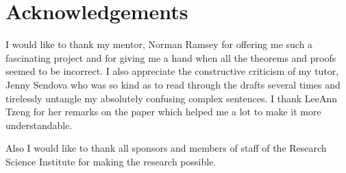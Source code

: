 \section{Acknowledgements}

I would like to thank my mentor, 
{Norman Ramsey}
for offering me such a fascinating project and for giving me a hand when
all the theorems and proofs seemed to be incorrect. I also appreciate the
constructive criticism of my tutor, {Jenny Sendova} 
who was so kind as to read
through the drafts several times and tirelessly untangle my absolutely
confusing complex sentences. I thank {LeeAnn Tzeng} for her remarks
on the paper which helped me a lot to make it more understandable.


Also I would like to thank all sponsors and members of staff of the
{Research Science Institute} for making the research possible.
